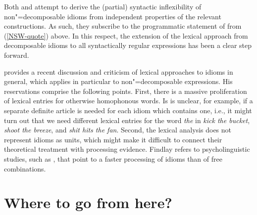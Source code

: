 \documentclass[output=paper]{langsci/langscibook}
\begin{document}
Both \cite{KSF2015a} and \cite{Bargmann:Sailer:18} attempt to derive the (partial) syntactic inflexibility of non"=decomposable idioms from independent properties of the relevant constructions. 
As such, they subscribe to the programmatic statement of \cite{NSW94a} from (\ref{NSW-quote}) above.  
In this respect, the extension of the lexical approach from decomposable idioms to all syntactically regular expressions has been a clear step forward. 

\cite{Findlay:17} provides a recent discussion and criticism of lexical approaches to idioms in general, which applies in particular to non"=decomposable expressions. 
His reservations comprise the following points. 
First, there is a massive proliferation of lexical entries for otherwise homophonous words. Is is unclear, for example, if a separate definite article is needed for each idiom which contains one, i.e., it might turn out that we need different lexical entries for the word \emph{the} in \emph{kick the bucket}, \emph{shoot the breeze}, and \emph{shit hits the fan}. 
Second, the lexical analysis does not represent idioms as units, which might make it difficult to connect their theoretical treatment with processing evidence. Findlay refers to psycholinguistic studies, such as \cite{Swinney:Cutler:79}, that point to a faster processing of idioms than of free combinations. 




\section{Where to go from here?}
\label{Sec-WhereToGo}
\end{document}
